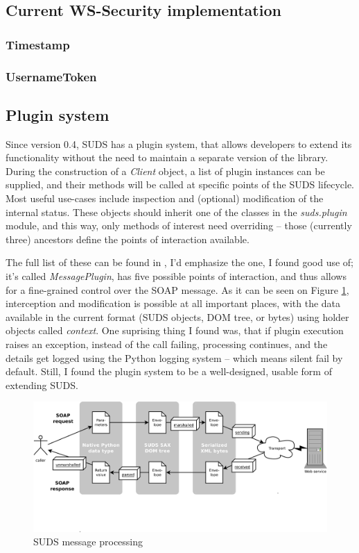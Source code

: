 \subsection{Current WS-Security implementation}

\subsubsection{Timestamp}


\subsubsection{UsernameToken}
\label{sudsUsernameToken}


\subsection{Plugin system}
\label{sudsPlugins}

Since version 0.4, SUDS has a plugin system, that allows developers to extend its functionality without the need to maintain a separate version of the library. During the construction of a \emph{Client} object, a list of plugin instances can be supplied, and their methods will be called at specific points of the SUDS lifecycle. Most useful use-cases include inspection and (optional) modification of the internal status. These objects should inherit one of the classes in the \emph{suds.plugin} module, and this way, only methods of interest need overriding -- those (currently three) ancestors define the points of interaction available.

The full list of these can be found in \cite{suds-doc}, I'd emphasize the one, I found good use of; it's called \emph{MessagePlugin}, has five possible points of interaction, and thus allows for a fine-grained control over the SOAP message. As it can be seen on Figure \ref{fig:sudsMessage}, interception and modification is possible at all important places, with the data available in the current format (SUDS objects, DOM tree, or bytes) using holder objects called \emph{context}. One suprising thing I found was, that if plugin execution raises an exception, instead of the call failing, processing continues, and the details get logged using the Python logging system -- which means silent fail by default. Still, I found the plugin system to be a well-designed, usable form of extending SUDS.

\begin{figure}[htbp]
 \centering
 \includegraphics[width=\textwidth]{images/sudsMessage.pdf}
 \caption{SUDS message processing}
 \label{fig:sudsMessage}
\end{figure}
